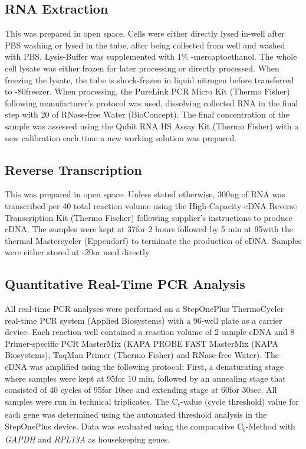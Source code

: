 \subsection{RNA Extraction}
This was prepared in open space. Cells were either directly lysed in-well after PBS washing or lysed in the tube, after being collected from well and washed with PBS. Lysis-Buffer was supplemented with 1\% \textbeta-mercaptoethanol. The whole cell lysate was either frozen for later processing or directly processed. When freezing the lysate, the tube is shock-frozen in liquid nitrogen before transferred to -80\degC freezer. When processing, the PureLink PCR Micro Kit (Thermo Fisher) following manufacturer's protocol was used, dissolving collected RNA in the final step with 20\mul{} of RNase-free Water (BioConcept). The final concentration of the sample was assessed using the Qubit RNA HS Assay Kit (Thermo Fisher) with a new calibration each time a new working solution was prepared.

\subsection{Reverse Transcription}
This was prepared in open space. Unless stated otherwise, 300ng of RNA was transcribed per 40\mul{} total reaction volume using the High-Capacity cDNA Reverse Transcription Kit (Thermo Fischer) following supplier's instructions to produce cDNA. The samples were kept at 37\degC for 2 hours followed by 5 min at 95\degC with the thermal Mastercycler (Eppendorf) to terminate the production of cDNA. Samples were either stored at -20\degC or used directly. 

\subsection{Quantitative Real-Time PCR Analysis}
All real-time PCR analyses were performed on a StepOnePlus ThermoCycler real-time PCR system (Applied Biosystems) with a 96-well plate as a carrier device. Each reaction well contained a reaction volume of 2\mul{} sample cDNA and 8\mul{} Primer-specific PCR MasterMix (KAPA PROBE FAST MasterMix (KAPA Biosystems), TaqMan\textregistered{} Primer (Thermo Fisher) and RNase-free Water). The cDNA was amplified using the following protocol: First, a denaturating stage where samples were kept at 95\degC for 10
min, followed by an annealing stage that consisted of 40 cycles of 95\degC for 10sec and extending stage at 60\degC for 30sec. All samples were run in technical triplicates. The C\textsubscript{t}-value (cycle threshold) value for each gene was determined using the automated threshold analysis in the StepOnePlus device. Data was evaluated using the comparative C\textsubscript{t}-Method with \textit{GAPDH} and \textit{RPL13A} as housekeeping genes.

